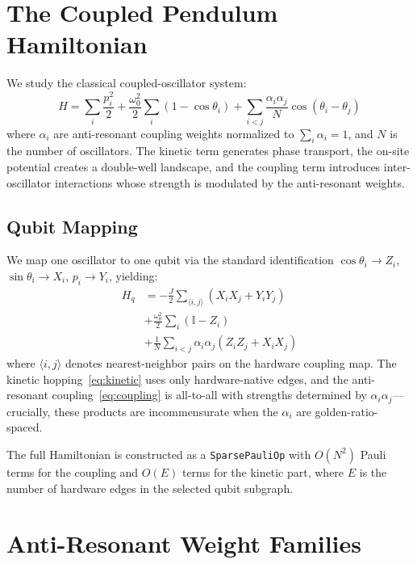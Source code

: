 \documentclass[twocolumn,showpacs,preprintnumbers,amsmath,amssymb,aps,prl]{revtex4-2}
\begin{document}
\section{The Coupled Pendulum Hamiltonian}
\label{sec:hamiltonian}

We study the classical coupled-oscillator system:
\begin{equation}
    H = \sum_i \frac{p_i^2}{2} + \frac{\omega_0^2}{2}\sum_i (1 - \cos\theta_i) + \sum_{i<j} \frac{\alpha_i \alpha_j}{N} \cos(\theta_i - \theta_j)
    \label{eq:classical_H}
\end{equation}
where $\alpha_i$ are anti-resonant coupling weights normalized to $\sum_i \alpha_i = 1$, and $N$ is the number of oscillators. The kinetic term generates phase transport, the on-site potential creates a double-well landscape, and the coupling term introduces inter-oscillator interactions whose strength is modulated by the anti-resonant weights.

\subsection{Qubit Mapping}

We map one oscillator to one qubit via the standard identification $\cos\theta_i \to Z_i$, $\sin\theta_i \to X_i$, $p_i \to Y_i$, yielding:
\begin{align}
    H_q &= -\frac{J}{2}\sum_{\langle i,j\rangle}(X_i X_j + Y_i Y_j) \label{eq:kinetic}\\
    &+ \frac{\omega_0^2}{2}\sum_i (\mathbb{I} - Z_i) \label{eq:potential}\\
    &+ \frac{1}{N}\sum_{i<j}\alpha_i\alpha_j(Z_iZ_j + X_iX_j) \label{eq:coupling}
\end{align}
where $\langle i,j\rangle$ denotes nearest-neighbor pairs on the hardware coupling map. The kinetic hopping~\eqref{eq:kinetic} uses only hardware-native edges, and the anti-resonant coupling~\eqref{eq:coupling} is all-to-all with strengths determined by $\alpha_i\alpha_j$---crucially, these products are incommensurate when the $\alpha_i$ are golden-ratio-spaced.

The full Hamiltonian is constructed as a \texttt{SparsePauliOp} with $O(N^2)$ Pauli terms for the coupling and $O(E)$ terms for the kinetic part, where $E$ is the number of hardware edges in the selected qubit subgraph.


\section{Anti-Resonant Weight Families}
\label{sec:weights}
\end{document}
